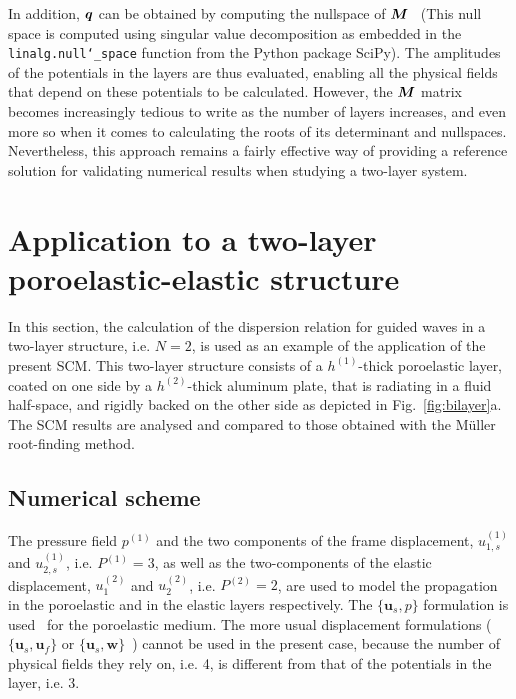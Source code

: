 In addition, $\boldsymbol q$ can be obtained by computing the nullspace of $\boldsymbol M$~\cite{strang2022} (This null space is computed using singular value decomposition as embedded in the \texttt{linalg.null\char`_space} function from the Python package SciPy). The amplitudes of the potentials in the layers are thus evaluated, enabling all the physical fields that depend on these potentials to be calculated. However, the $\boldsymbol M$ matrix becomes increasingly tedious to write as the number of layers increases, and even more so when it comes to calculating the roots of its determinant and nullspaces. Nevertheless, this approach remains a fairly effective way of providing a reference solution for validating numerical results when studying a two-layer system.
    
\section{Application to a two-layer poroelastic-elastic structure}\label{Section3}

 In this section, the calculation of the dispersion relation for guided waves in a two-layer structure, i.e. $N=2$, is used as an example of the application of the present SCM. This two-layer structure consists of a $h^{(1)}$-thick poroelastic layer, coated on one side by a $h^{(2)}$-thick aluminum plate,  that is radiating in a fluid half-space, and rigidly backed on the other side as depicted in Fig.~\ref{fig:bilayer}a. The SCM results are analysed and compared to those obtained with the Müller root-finding method. 

    
\subsection{Numerical scheme}
The pressure field $p^{(1)}$ and the two components of the frame displacement, $u_{1, s}^{(1)}$ and $u_{2,s}^{(1)}$, i.e. $P^{(1)} = 3$, as well as the two-components of the elastic displacement, $u_1^{(2)}$ and $u_2^{(2)}$, i.e. $P^{(2)} = 2$, are used to model the propagation in the poroelastic and in the elastic layers respectively. The $\{\mathbf{ u}_s, p \}$ formulation is used~\cite{atalla1998} for the poroelastic medium. The more usual displacement formulations ($\{\mathbf{u}_s, \mathbf{u}_f\}$\cite{biot1956} or $\{\mathbf{u}_s, \mathbf{w}\}$~\cite{biot1962}) cannot be used in the present case, because the number of physical fields they rely on, i.e. 4, is different from that of the potentials in the layer, i.e. 3.



